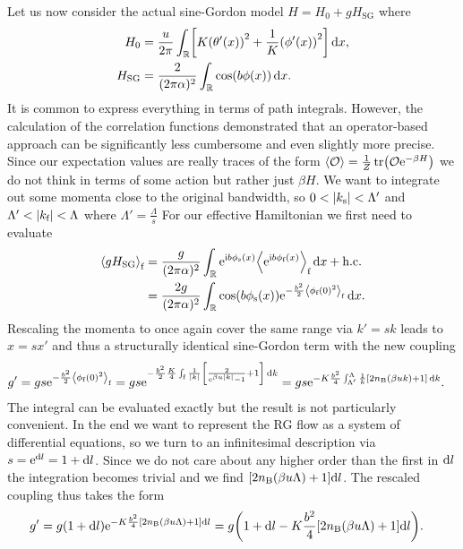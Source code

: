 \documentclass[english, parskip=full]{scrartcl}
\begin{document}
Let us now consider the actual sine-Gordon model $H=H_0 + gH_\text{SG}$ where
\begin{align}
H_0 &= \frac{u}{2\pi} \intr{ \klb*{K\kla*{\theta'(x)}^2 + \frac{1}{K} \kla*{\phi'(x)}^2} }{x},\\
H_\text{SG} &= \frac{2}{(2\pi\alpha)^2} \intr{ \cos\kla*{b\phi(x)}}{x}.
\end{align}
It is common to express everything in terms of path integrals.
However, the calculation of the correlation functions demonstrated that an operator-based approach can be significantly less cumbersome and even slightly more precise.
Since our expectation values are really traces of the form $\bra*{\mathcal{O}} = \frac{1}{Z}\tr \kla*{\mathcal{O} \powe{-\beta H}}$ we do not think in terms of some action but rather just $\beta H$.
We want to integrate out some momenta close to the original bandwidth, so $0<|k_\s|<\Lambda'$ and $\Lambda'<|k_\f|<\Lambda$ where $\Lambda'= \frac{\Lambda}{s}$
For our effective Hamiltonian we first need to evaluate
\begin{align}
\bra*{g H_\text{SG}}_\f &= \frac{g}{(2\pi\alpha)^2} \intr{\powe{\i b\phi_\s(x)} \bra*{\powe{\i b\phi_\f(x)}}_\f }{x} +\hc\\
&= \frac{2g}{(2\pi\alpha)^2} \intr{\cos\kla*{b\phi_\s(x)} \powe{-\frac{b^2}{2} \bra*{\phi_\f(0)^2}_\f}}{x}.
\end{align}
Rescaling the momenta to once again cover the same range via $k'=sk$ leads to $x=sx'$ and thus a structurally identical sine-Gordon term with the new coupling
\begin{align}
g' &= g s \powe{-\frac{b^2}{2} \bra*{\phi_\f(0)^2}_\f} = gs \powe{-\frac{b^2}{2} \frac{K}{4}\intx{\f}{}{\frac{1}{|k|} \klb*{\frac{2}{\powe{\beta u |k|} - 1} + 1}}{k}} = gs \powe{-K\frac{b^2}{4} \intx{\Lambda'}{\Lambda}{ \frac{1}{k} \klb*{2 n_\B(\beta uk) + 1}}{k}}.
\end{align}
The integral can be evaluated exactly but the result is not particularly convenient.
In the end we want to represent the RG flow as a system of differential equations, so we turn to an infinitesimal description via $s=\powe{\d l} = 1 + \d l$.
Since we do not care about any higher order than the first in $\d l$ the integration becomes trivial and we find $\klb*{2n_\B(\beta u\Lambda) + 1} \d l$.
The rescaled coupling thus takes the form
\begin{align}
g' &= g \kla*{1 + \d l} \powe{-K\frac{b^2}{4} \klb*{2 n_\B(\beta u\Lambda) + 1} \d l} = g \kla*{1 + \d l - K \frac{b^2}{4} \klb*{2n_\B(\beta u\Lambda) + 1} \d l}.
\end{align}
\end{document}
